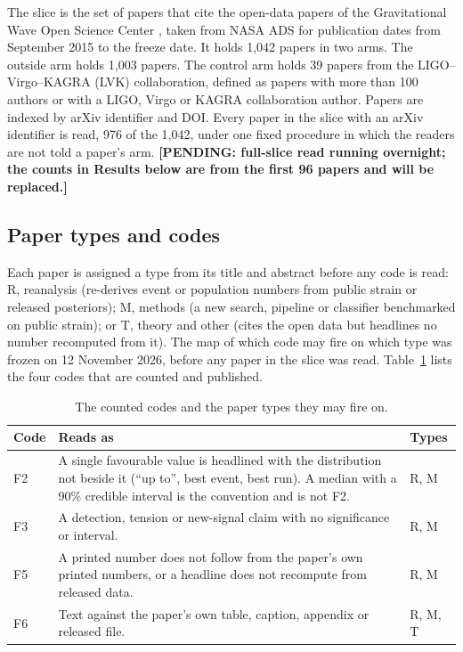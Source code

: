 \documentclass[reprint,amsmath,amssymb,aps,superscriptaddress,nofootinbib]{revtex4-2}
\newcommand{\pend}[1]{\textbf{[PENDING: #1]}}
\begin{document}
The slice is the set of papers that cite the open-data papers of the Gravitational Wave Open Science Center \cite{GWOSC2021,GWOSC2023,Vallisneri2015}, taken from NASA ADS for publication dates from September 2015 to the freeze date. It holds 1,042 papers in two arms. The outside arm holds 1,003 papers. The control arm holds 39 papers from the LIGO--Virgo--KAGRA (LVK) collaboration, defined as papers with more than 100 authors or with a LIGO, Virgo or KAGRA collaboration author. Papers are indexed by arXiv identifier and DOI. Every paper in the slice with an arXiv identifier is read, 976 of the 1,042, under one fixed procedure in which the readers are not told a paper's arm. \pend{full-slice read running overnight; the counts in Results below are from the first 96 papers and will be replaced.}

\subsection{Paper types and codes}

Each paper is assigned a type from its title and abstract before any code is read: R, reanalysis (re-derives event or population numbers from public strain or released posteriors); M, methods (a new search, pipeline or classifier benchmarked on public strain); or T, theory and other (cites the open data but headlines no number recomputed from it). The map of which code may fire on which type was frozen on 12 November 2026, before any paper in the slice was read. Table~\ref{tab:codes} lists the four codes that are counted and published.

\begin{table}[t]
\caption{The counted codes and the paper types they may fire on.}
\label{tab:codes}
\centering\small
\begin{tabularx}{\linewidth}{l>{\raggedright\arraybackslash}X l}
\hline\hline
Code & Reads as & Types \\ \hline
F2 & A single favourable value is headlined with the distribution not beside it (``up to'', best event, best run). A median with a 90\% credible interval is the convention and is not F2. & R, M \\
F3 & A detection, tension or new-signal claim with no significance or interval. & R, M \\
F5 & A printed number does not follow from the paper's own printed numbers, or a headline does not recompute from released data. & R, M \\
F6 & Text against the paper's own table, caption, appendix or released file. & R, M, T \\
\hline\hline
\end{tabularx}
\end{table}
\end{document}
